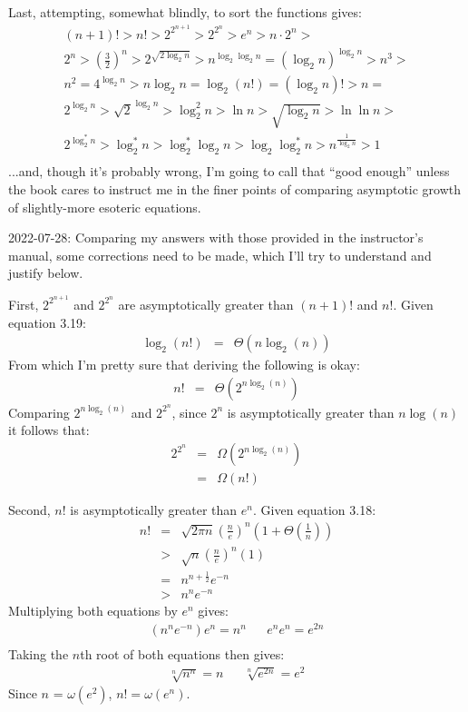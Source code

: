 \documentclass{article}
\begin{document}
Last, attempting, somewhat blindly, to sort the functions gives:
\begin{multline}
	(n+1)! > n! > 2^{2^{n+1}} > 2^{2^n} > e^n > n \cdot 2^n > \\
	2^n > \left(\frac{3}{2}\right)^n > 2^{\sqrt{2 \log_2 n}} > n^{\log_2 \log_2 n} = \left(\log_2 n\right)^{\log_2 n} > n^3 > \\
	n^2 = 4^{\log_2 n} > n \log_2 n = \log_2 (n!) = \left(\log_2 n\right)! > n = \\
	2^{\log_2 n} > \sqrt{2}^{\log_2 n} > \log^2_2 n > \ln n > \sqrt{\log_2 n} > \ln \ln n > \\
	2^{\log^*_2 n} > \log^*_2 n > \log^*_2 \log_2 n > \log_2 \log^*_2 n > n^{\frac{1}{\log_2 n}} > 1 \\
\end{multline}
...and, though it's probably wrong, I'm going to call that ``good enough'' unless the book cares to instruct me in the finer points of comparing asymptotic growth of slightly-more esoteric equations.

2022-07-28: Comparing my answers with those provided in the instructor's manual, some corrections need to be made, which I'll try to understand and justify below.

First, $2^{2^{n+1}}$ and $2^{2^n}$ are asymptotically greater than $(n+1)!$ and $n!$.  Given equation 3.19:
\begin{eqnarray*}
	\log_2(n!) & = & \Theta(n \log_2(n))
\end{eqnarray*}
From which I'm pretty sure that deriving the following is okay:
\begin{eqnarray*}
	n! & = & \Theta(2^{n \log_2(n)})
\end{eqnarray*}
Comparing $2^{n \log_2(n)}$ and $2^{2^n}$, since $2^n$ is asymptotically greater than $n\log(n)$ it follows that:
\begin{eqnarray*}
	2^{2^n} & = & \Omega(2^{n \log_2 (n)}) \\
	& = & \Omega(n!)
\end{eqnarray*}

Second, $n!$ is asymptotically greater than $e^n$.  Given equation 3.18:
\begin{eqnarray*}
	n! & = & \sqrt{2 \pi n} \left ( \frac{n}{e} \right )^n \left ( 1 + \Theta \left ( \frac{1}{n} \right ) \right ) \\
	 & > & \sqrt{n} \left ( \frac{n}{e} \right )^n ( 1 ) \\
	 & = & n^{n+\frac{1}{2}} e^{-n} \\
	 & > & n^n e^{-n}
\end{eqnarray*}
Multiplying both equations by $e^n$ gives:
\begin{eqnarray*}
	(n^n e^{-n}) e^n = n^n & & e^n e^n = e^{2n} \\
\end{eqnarray*}
Taking the $n$th root of both equations then gives:
\begin{eqnarray*}
	\sqrt[n]{n^n} = n & & \sqrt[n]{e^{2n}} = e^2
\end{eqnarray*}
Since $n$ = $\omega ( e^2 )$, $n! = \omega ( e^n )$.
\end{document}
